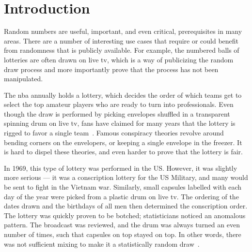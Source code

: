 \section{Introduction}\label{cha:introduction}

Random numbers are useful, important, and even critical, prerequisites in many areas.
There are a number of interesting use cases that require or could benefit from randomness that is publicly available. For example, the numbered balls of lotteries are often drawn on live tv, which is a way of publicizing the random draw process and more importantly prove that the process has not been manipulated.

The \gls{nba} annually holds a lottery, which decides the order of which teams get to select the top amateur players who are ready to turn into professionals. Even though the draw is performed by picking envelopes shuffled in a transparent spinning drum on live tv, fans have claimed for many years that the lottery is rigged to favor a single team~\cite{princeton2016}. Famous conspiracy theories revolve around bending corners on the envelopers, or keeping a single envelope in the freezer. It is hard to dispel these theories, and even harder to prove that the lottery is fair.

In 1969, this type of lottery was performed in the US\@. However, it was slightly more serious --- it was a conscription lottery for the US Military, and many would be sent to fight in the Vietnam war. Similarly, small capsules labelled with each day of the year were picked from a plastic drum on live tv. The ordering of the dates drawn and the birthdays of all men then determined the conscription order. The lottery was quickly proven to be botched; statisticians noticed an anomalous pattern. The broadcast was reviewed, and the drum was always turned an even number of times, such that capsules on top stayed on top. In other words, there was not sufficient mixing to make it a statistically random draw~\cite{princeton2016}.

